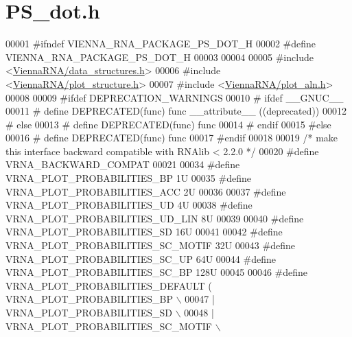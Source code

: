 \hypertarget{PS__dot_8h_source}{}\section{P\+S\+\_\+dot.\+h}
\label{PS__dot_8h_source}

\begin{DoxyCode}
00001 \textcolor{preprocessor}{#ifndef VIENNA\_RNA\_PACKAGE\_PS\_DOT\_H}
00002 \textcolor{preprocessor}{#define VIENNA\_RNA\_PACKAGE\_PS\_DOT\_H}
00003 
00004 
00005 \textcolor{preprocessor}{#include <\hyperlink{data__structures_8h}{ViennaRNA/data\_structures.h}>}
00006 \textcolor{preprocessor}{#include <\hyperlink{plot__structure_8h}{ViennaRNA/plot\_structure.h}>}
00007 \textcolor{preprocessor}{#include <\hyperlink{plot__aln_8h}{ViennaRNA/plot\_aln.h}>}
00008 
00009 \textcolor{preprocessor}{#ifdef DEPRECATION\_WARNINGS}
00010 \textcolor{preprocessor}{# ifdef \_\_GNUC\_\_}
00011 \textcolor{preprocessor}{#  define DEPRECATED(func) func \_\_attribute\_\_ ((deprecated))}
00012 \textcolor{preprocessor}{# else}
00013 \textcolor{preprocessor}{#  define DEPRECATED(func) func}
00014 \textcolor{preprocessor}{# endif}
00015 \textcolor{preprocessor}{#else}
00016 \textcolor{preprocessor}{# define DEPRECATED(func) func}
00017 \textcolor{preprocessor}{#endif}
00018 
00019 \textcolor{comment}{/* make this interface backward compatible with RNAlib < 2.2.0 */}
00020 \textcolor{preprocessor}{#define VRNA\_BACKWARD\_COMPAT}
00021 
00034 \textcolor{preprocessor}{#define VRNA\_PLOT\_PROBABILITIES\_BP        1U}
00035 \textcolor{preprocessor}{#define VRNA\_PLOT\_PROBABILITIES\_ACC       2U}
00036 
00037 \textcolor{preprocessor}{#define VRNA\_PLOT\_PROBABILITIES\_UD        4U}
00038 \textcolor{preprocessor}{#define VRNA\_PLOT\_PROBABILITIES\_UD\_LIN    8U}
00039 
00040 \textcolor{preprocessor}{#define VRNA\_PLOT\_PROBABILITIES\_SD        16U}
00041 
00042 \textcolor{preprocessor}{#define VRNA\_PLOT\_PROBABILITIES\_SC\_MOTIF  32U}
00043 \textcolor{preprocessor}{#define VRNA\_PLOT\_PROBABILITIES\_SC\_UP     64U}
00044 \textcolor{preprocessor}{#define VRNA\_PLOT\_PROBABILITIES\_SC\_BP     128U}
00045 
00046 \textcolor{preprocessor}{#define VRNA\_PLOT\_PROBABILITIES\_DEFAULT   (   VRNA\_PLOT\_PROBABILITIES\_BP \(\backslash\)}
00047 \textcolor{preprocessor}{                                            | VRNA\_PLOT\_PROBABILITIES\_SD \(\backslash\)}
00048 \textcolor{preprocessor}{                                            | VRNA\_PLOT\_PROBABILITIES\_SC\_MOTIF \(\backslash\)}

\end{DoxyCode}
